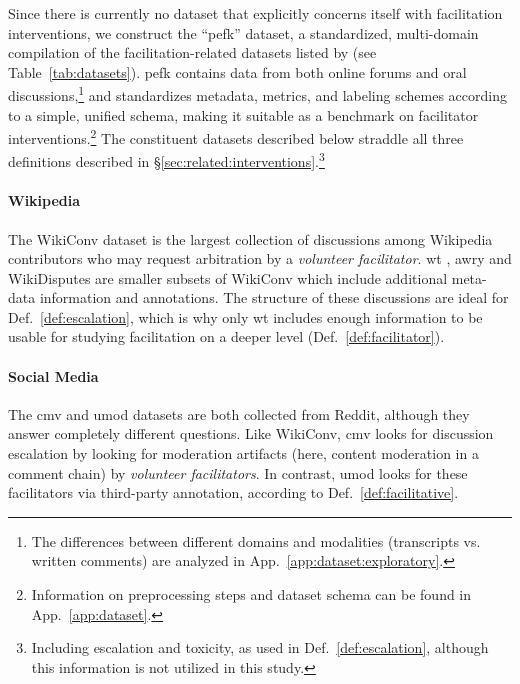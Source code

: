 \documentclass[11pt]{article}
\theoremstyle{definition}
\theoremstyle{plain}
\begin{document}
Since there is currently no dataset that explicitly concerns itself with facilitation interventions, we construct the ``\acf{pefk}'' dataset, a standardized, multi-domain compilation of the facilitation-related datasets listed by \citet{korre-etal-2025-evaluation} (see Table~\ref{tab:datasets}). \ac{pefk} contains data from both online forums and oral discussions,\footnote{The differences between different domains and modalities (transcripts vs. written comments) are analyzed in App.~\ref{app:dataset:exploratory}.} and standardizes metadata, metrics, and labeling schemes according to a simple, unified schema, making it suitable as a benchmark on facilitator interventions.\footnote{Information on preprocessing steps and dataset schema can be found in App.~\ref{app:dataset}.} The constituent datasets described below straddle all three definitions described in \S\ref{sec:related:interventions}.\footnote{Including escalation and toxicity, as used in Def.~\ref{def:escalation}, although this information is not utilized in this study.} 

\paragraph{Wikipedia} The WikiConv \citep{wikiconv} dataset is the largest collection of discussions among Wikipedia contributors who may request arbitration by a \emph{volunteer facilitator}. \ac{wt} \citep{wikitactics}, \ac{awry} \citep{cmv_awry2} and WikiDisputes \citep{wikidisputes} are smaller subsets of WikiConv which include additional meta-data information and annotations. The structure of these discussions are ideal for Def.~\ref{def:escalation}, which is why only \ac{wt} includes enough information to be usable for studying facilitation on a deeper level (Def.~\ref{def:facilitator}).

\paragraph{Social Media} The \ac{cmv} \citep{cmv_awry2} and \ac{umod} \citep{umod} datasets are both collected from Reddit, although they answer completely different questions. Like WikiConv, \ac{cmv} looks for discussion escalation by looking for moderation artifacts (here, content moderation in a comment chain) by \emph{volunteer facilitators}. In contrast, \ac{umod} looks for these facilitators via third-party annotation, according to Def.~\ref{def:facilitative}.
\end{document}
